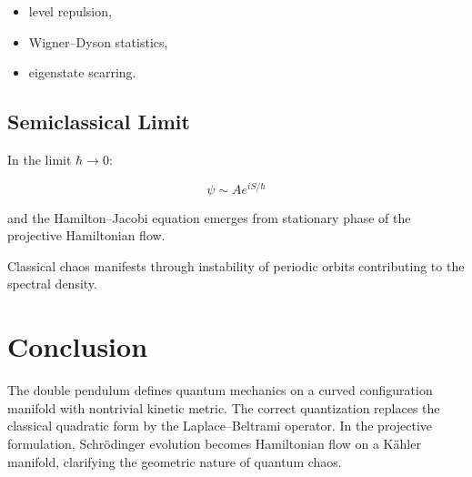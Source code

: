 \documentclass[11pt]{article}
\begin{document}
\begin{itemize}
\item level repulsion,
\item Wigner--Dyson statistics,
\item eigenstate scarring.
\end{itemize}

\subsection{Semiclassical Limit}

In the limit $\hbar \to 0$:

\[
\psi \sim A e^{iS/\hbar}
\]

and the Hamilton--Jacobi equation emerges from
stationary phase of the projective Hamiltonian flow.

Classical chaos manifests through instability of
periodic orbits contributing to the spectral density.

\section{Conclusion}

The double pendulum defines quantum mechanics on a curved
configuration manifold with nontrivial kinetic metric.
The correct quantization replaces the classical quadratic
form by the Laplace--Beltrami operator.
In the projective formulation,
Schr\"odinger evolution becomes Hamiltonian flow on a
K\"ahler manifold,
clarifying the geometric nature of quantum chaos.
\end{document}
